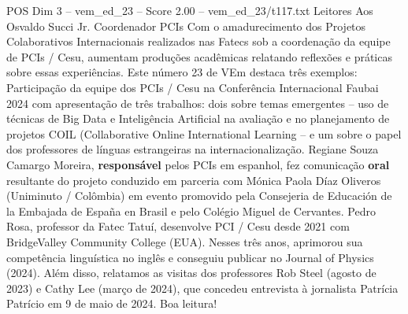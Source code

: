 \begin{textsample}{POS Dim 3 – vem\_ed\_23 – Score 2.00 – vem\_ed\_23/t117.txt}  \label{ex:f3_pos_102}
Leitores Aos Osvaldo Succi Jr.
Coordenador PCIs Com o amadurecimento dos Projetos Colaborativos Internacionais realizados nas Fatecs sob a coordenação da equipe de PCIs / Cesu, aumentam produções acadêmicas relatando reflexões e práticas sobre essas experiências.
Este número 23 de VEm destaca três exemplos: Participação da equipe dos PCIs / Cesu na Conferência Internacional Faubai 2024 com apresentação de três trabalhos: dois sobre temas emergentes – uso de técnicas de Big Data e Inteligência Artificial na avaliação e no planejamento de projetos COIL (Collaborative Online International Learning – e um sobre o papel dos professores de línguas estrangeiras na internacionalização.
Regiane Souza Camargo Moreira, \textbf{responsável} pelos PCIs em espanhol, fez comunicação \textbf{oral} resultante do projeto conduzido em parceria com Mónica Paola Díaz Oliveros (Uniminuto / Colômbia) em evento promovido pela Consejeria de Educación de la Embajada de España en Brasil e pelo Colégio Miguel de Cervantes.
Pedro Rosa, professor da Fatec Tatuí, desenvolve PCI / Cesu desde 2021 com BridgeValley Community College (EUA).
Nesses três anos, aprimorou sua competência linguística no inglês e conseguiu publicar no Journal of Physics (2024).
Além disso, relatamos as visitas dos professores Rob Steel (agosto de 2023) e Cathy Lee (março de 2024), que concedeu entrevista à jornalista Patrícia Patrício em 9 de maio de 2024.
Boa leitura!

\end{textsample}

